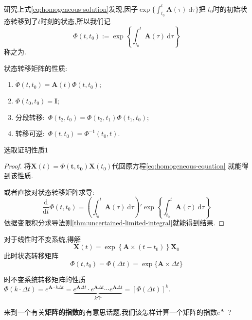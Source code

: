 \documentclass[cn,10pt,citestyle=gb7714-2015,bibstyle=gb7714-2015]{elegantbook}
\renewcommand{\emph}[1]{\textbf{#1}}%
\newcommand{\md}{\ \mathrm{d}}
\begin{document}
研究上式\eqref{eq:homogeneous-solution}发现,因子$\exp\{\int_{t_0}^t\bm{A}(\tau)\md\tau\}$把
$t_0$时的初始状态转移到了$t$时刻的状态,所以我们记
\begin{equation}\label{eq:state-trans-matrix}
  \bm{\varPhi}(t,t_0):=\exp\left\{\int_{t_0}^t\bm{A}(\tau)\md\tau\right\}
\end{equation}
称之为.
\begin{property}状态转移矩阵的性质:
  \begin{enumerate}
    \item $\dot{\bm{\varPhi}}(t,t_0)=\bm{A}(t)\bm{\varPhi}(t,t_0)$;
    \item $\bm{\varPhi}(t_0,t_0)=\bm{I}$;
    \item 分段转移:\ $\bm{\varPhi}(t_2,t_0)=\bm{\varPhi}(t_2,t_1)\bm{\varPhi}(t_1,t_0)$;
    \item 转移可逆:\ $\bm{\varPhi}(t,t_0)=\bm{\varPhi}^{-1}(t_0,t)$.
  \end{enumerate}
\end{property}
选取证明性质1
\begin{proof}
  将$\bm{X}(t)=\bm{\varPhi(t,t_0)}\bm{X}(t_0)$代回原方程\eqref{eq:homogeneous-equation}
  就能得到该性质.
  
  或者直接对状态转移矩阵求导:
  \[
      \frac{\mathrm{d}}{\mathrm{d}t}\bm{\varPhi}(t,t_0)=\left(\int_{t_0}^t\bm{A}(\tau)\md\tau\right)'\exp\left\{\int_{t_0}^t\bm{A}(\tau)\md\tau\right\}
  \]
  依据变限积分求导法则\ref{thm:uncertained-limited-integral}就能得到结果.
\end{proof}
对于线性时不变系统,得解
\begin{equation}\label{eq:homogeneous-solution-for-nontime-system}
  \bm{X}(t)=\exp\left\{\bm{A}\times(t-t_0)\right\}\bm{X}_0
\end{equation}
此时状态转移矩阵
\begin{equation}\label{eq:state-trans-matrix-for-nontime-system}
  \bm{\varPhi}(t,t_0)=\bm{\varPhi}(\Delta t)=\exp\{\bm{A}\times\Delta t\}
\end{equation}
\begin{property}时不变系统转移矩阵的性质\\
  $\bm{\varPhi}(k\cdot\Delta t)=e^{\bm{A}\cdot k\Delta t}=\underbrace{e^{\bm{A}\Delta t}\cdot e^{\bm{A}\Delta t}\cdots e^{\bm{A}\Delta t}}_{k\text{个}}=[\bm{\varPhi}(\Delta t)]^k$.
\end{property}
来到一个有关\emph{矩阵的指数}的有意思话题,我们该怎样计算一个矩阵的指数$e^{\bm{A}}$\ ?
\end{document}
